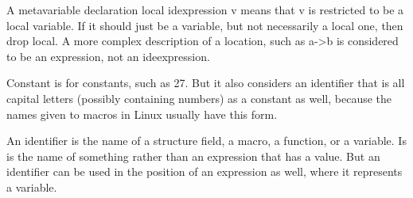 \begin{grammar}




\end{grammar}

A metavariable declaration local idexpression v means that v is restricted
to be a local variable.  If it should just be a variable, but not
necessarily a local one, then drop local.  A more complex description of a
location, such as a->b is considered to be an expression, not an
ideexpression.

Constant is for constants, such as 27.  But it also considers an identifier
that is all capital letters (possibly containing numbers) as a constant as
well, because the names given to macros in Linux usually have this form.

An identifier is the name of a structure field, a macro, a function, or a
variable.  Is is the name of something rather than an expression that has a
value.  But an identifier can be used in the position of an expression as
well, where it represents a variable.

